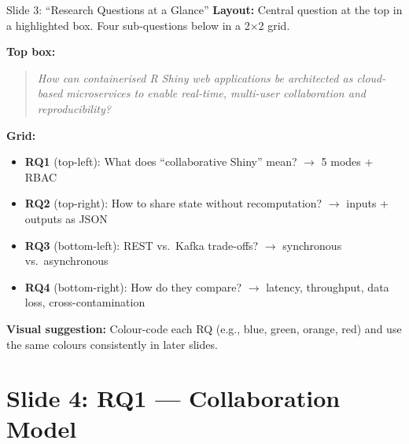 \documentclass[12pt,a4paper]{article}
\begin{document}
\begin{slidebox}{Slide 3: ``Research Questions at a Glance''}
\textbf{Layout:} Central question at the top in a highlighted box. Four sub-questions below in a 2$\times$2 grid.

\textbf{Top box:}
\begin{quote}
\textit{How can containerised R Shiny web applications be architected as cloud-based microservices to enable real-time, multi-user collaboration and reproducibility?}
\end{quote}

\textbf{Grid:}
\begin{itemize}[nosep]
  \item \textbf{RQ1} (top-left): What does ``collaborative Shiny'' mean? $\rightarrow$ 5 modes + RBAC
  \item \textbf{RQ2} (top-right): How to share state without recomputation? $\rightarrow$ inputs + outputs as JSON
  \item \textbf{RQ3} (bottom-left): REST vs.\ Kafka trade-offs? $\rightarrow$ synchronous vs.\ asynchronous
  \item \textbf{RQ4} (bottom-right): How do they compare? $\rightarrow$ latency, throughput, data loss, cross-contamination
\end{itemize}

\textbf{Visual suggestion:} Colour-code each RQ (e.g., blue, green, orange, red) and use the same colours consistently in later slides.
\end{slidebox}

\section{Slide 4: RQ1 --- Collaboration Model}
\end{document}
